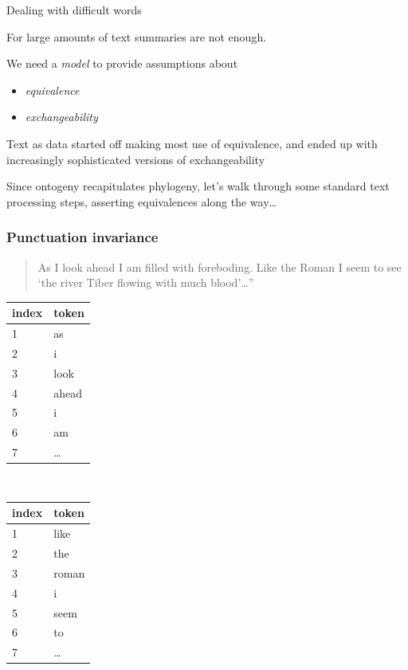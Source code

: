 \documentclass{hertieteaching}\usepackage[]{graphicx}\usepackage[]{color}
\begin{document}
\begin{frame}{Dealing with difficult words}

For large amounts of text summaries are not enough.

We need a \textit{model} to provide assumptions about
\begin{itemize}
  \item \textit{equivalence}
  \item \textit{exchangeability}
\end{itemize}



Text as data started off making most use of equivalence, and ended up with increasingly sophisticated versions of exchangeability

Since ontogeny recapitulates phylogeny, let's walk through some standard text processing steps, asserting equivalences along the way\ldots

\end{frame}
\begin{frame}[t]\frametitle{Punctuation invariance}

\begin{quote}As I look ahead I am filled with foreboding.  Like the Roman I seem to see `the river Tiber flowing with much blood'\ldots ''\\
\hfill\parencite{Powell1968}
\end{quote}

\pause

\begin{center}
{\small
\begin{tabular}{ll}\toprule
index & token\\ \midrule
1 & as\\
2 & i\\
3 & look\\
4 & ahead\\
5 & i\\
6 & am\\
7 & \ldots\\ \bottomrule
\end{tabular}
~~~~~~~~~~
\begin{tabular}{ll}\toprule
index & token\\ \midrule
1 & like\\
2 & the\\
3 & roman\\
4 & i\\
5 & seem\\
6 & to\\
7 & \ldots\\ \bottomrule
\end{tabular}
}
\end{center}


\end{frame}
\end{document}
